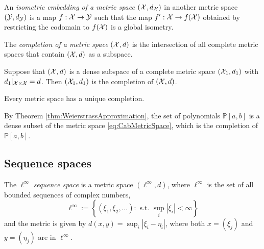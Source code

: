 \begin{defn}
  \label{def:isometricEmbedding}
  An \emph{isometric embedding of
  a metric space} $({\cal X}, d_{{\cal X}})$
  in another metric space
  $({\cal Y}, d_{{\cal Y}})$
  is a map $f: {\cal X}\rightarrow {\cal Y}$
  such that the map $f': {\cal X}\rightarrow f({\cal X})$
  obtained by restricting the codomain to $f({\cal X})$
  is a global isometry.
\end{defn}

\begin{defn}
  \label{def:completionMetricSpace}
  The \emph{completion of a metric space} $({\cal X}, d)$ 
  is the intersection of all complete metric spaces
  that contain $({\cal X}, d)$ as a subspace.
\end{defn}

\begin{lem}
  \label{lem:denseCompletion}
  Suppose that $({\cal X}, d)$ is a dense subspace
  of a complete metric space $({\cal X}_1, d_1)$
  with $d_1|_{{\cal X}\times{\cal X}} = d$.
  Then $({\cal X}_1, d_1)$ is the completion of $({\cal X}, d)$.
\end{lem}

\begin{thm}
  \label{thm:existenceOfMetricCompletion}
  Every metric space has a unique completion.
\end{thm}

\begin{exm}
  \label{exm:polynomialDenseInCab}
  By Theorem \ref{thm:WeierstrassApproximation}, 
  the set of polynomials $\mathbb{P}[a,b]$
  is a dense subset of the metric space \eqref{eq:CabMetricSpace}, 
  which is the completion of $\mathbb{P}[a,b]$.
\end{exm}

\subsection{Sequence spaces}
\label{sec:metric-spaces-basicAnal}

\begin{defn}
  \label{def:lInftySeqSpace}
  The $\ell^{\infty}$ \emph{sequence space} 
  is a metric space $(\ell^{\infty},d)$,
  where $\ell^{\infty}$ is the set of all bounded sequences
  of complex numbers,
  \begin{equation}
    \label{eq:ellInftySpace}
    \ell^{\infty} := \left\{
      (\xi_1, \xi_2, \ldots):
      \text{ s.t. } \sup_{i}|\xi_i| < \infty
      \right\}
  \end{equation}
  and the metric is given by
  $d(x,y) = \sup_{i}|\xi_i- \eta_i|$, 
  where both $x=(\xi_j)$ and $y=(\eta_j)$ are in $\ell^{\infty}$. 
\end{defn}

